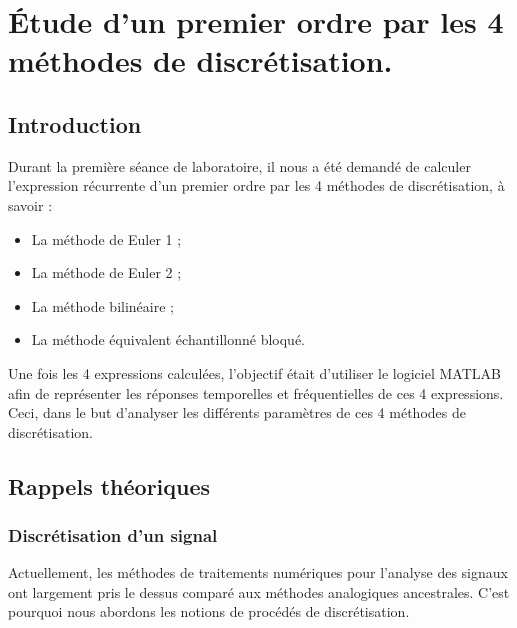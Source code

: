 \chapter{Étude d'un premier ordre par les 4 méthodes de discrétisation.}

\section{Introduction}

Durant la première séance de laboratoire, il nous a été demandé de calculer l'expression récurrente d'un premier ordre par les 4 méthodes de discrétisation, à savoir : 
\begin{itemize}
\item La méthode de Euler 1 ;
\item La méthode de Euler 2 ;
\item La méthode bilinéaire ;
\item La méthode équivalent échantillonné bloqué.
\end{itemize}
Une fois les 4 expressions calculées, l'objectif était d'utiliser le logiciel MATLAB afin de représenter les réponses temporelles et fréquentielles de ces 4 expressions. Ceci, dans le but d'analyser les différents paramètres de ces 4 méthodes de discrétisation.


\section{Rappels théoriques}

\subsection{Discrétisation d'un signal}

Actuellement, les méthodes de traitements numériques pour l'analyse des signaux ont largement pris le dessus comparé aux méthodes analogiques ancestrales. C'est pourquoi nous abordons les notions de procédés de discrétisation. 
